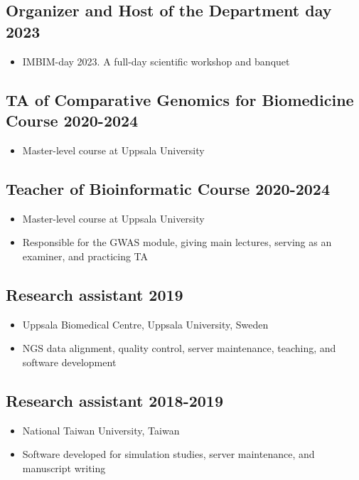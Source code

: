 \documentclass[10pt]{article}
\begin{document}
\subsection*{Organizer and Host of the Department day \hfill 2023}
\begin{itemize}
\item IMBIM-day 2023. A full-day scientific workshop and banquet
\end{itemize}

\subsection*{TA of Comparative Genomics for Biomedicine Course \hfill 2020-2024}
\begin{itemize}
\item Master-level course at Uppsala University
\end{itemize}

\subsection*{Teacher of Bioinformatic Course \hfill 2020-2024}
\begin{itemize}
\item Master-level course at Uppsala University
\item Responsible for the GWAS module, giving main lectures, serving as an examiner, and practicing TA
\end{itemize}

\subsection*{Research assistant \hfill 2019}
\begin{itemize}
\item Uppsala Biomedical Centre, Uppsala University, Sweden
\item NGS data alignment, quality control, server maintenance, teaching, and software development
\end{itemize}

\subsection*{Research assistant \hfill 2018-2019}
\begin{itemize}
\item National Taiwan University, Taiwan
\item Software developed for simulation studies, server maintenance, and manuscript writing
\end{itemize}
\end{document}
